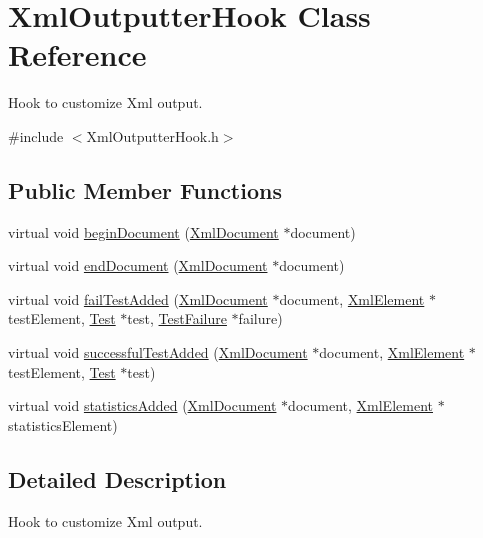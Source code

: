 \hypertarget{class_xml_outputter_hook}{\section{Xml\-Outputter\-Hook Class Reference}
\label{class_xml_outputter_hook}
}


Hook to customize Xml output.  




{\ttfamily \#include $<$Xml\-Outputter\-Hook.\-h$>$}

\subsection*{Public Member Functions}
\begin{DoxyCompactItemize}
\item 
virtual void \hyperlink{class_xml_outputter_hook_a1d2b5d5d0fc42d273d6430522a70ccbb}{begin\-Document} (\hyperlink{class_xml_document}{Xml\-Document} $\ast$document)
\item 
virtual void \hyperlink{class_xml_outputter_hook_a300e2a4ef46db4e76428e32f7c7e6a23}{end\-Document} (\hyperlink{class_xml_document}{Xml\-Document} $\ast$document)
\item 
virtual void \hyperlink{class_xml_outputter_hook_a77310985e055cc2c67e91a42c524fbbe}{fail\-Test\-Added} (\hyperlink{class_xml_document}{Xml\-Document} $\ast$document, \hyperlink{class_xml_element}{Xml\-Element} $\ast$test\-Element, \hyperlink{class_test}{Test} $\ast$test, \hyperlink{class_test_failure}{Test\-Failure} $\ast$failure)
\item 
virtual void \hyperlink{class_xml_outputter_hook_adbcf6ad2cb85d6f1015306fadb7eadcf}{successful\-Test\-Added} (\hyperlink{class_xml_document}{Xml\-Document} $\ast$document, \hyperlink{class_xml_element}{Xml\-Element} $\ast$test\-Element, \hyperlink{class_test}{Test} $\ast$test)
\item 
virtual void \hyperlink{class_xml_outputter_hook_a0e602260274d4f005affb4ee84ce4c4a}{statistics\-Added} (\hyperlink{class_xml_document}{Xml\-Document} $\ast$document, \hyperlink{class_xml_element}{Xml\-Element} $\ast$statistics\-Element)
\end{DoxyCompactItemize}


\subsection{Detailed Description}
Hook to customize Xml output. 


